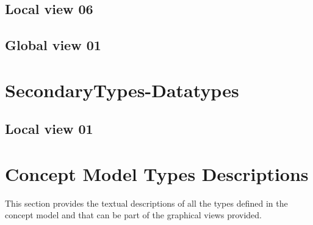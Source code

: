 \subsection{Local view 06}
\label{sec:ru.iu.bachelor.sed.group01.icrash-CM-view-local-PrimaryTypes-Datatypes-06}


\subsection{Global view 01}
\label{sec:ru.iu.bachelor.sed.group01.icrash-CM-view-global-PrimaryTypes-Datatypes-01}





\section{SecondaryTypes-Datatypes}
\subsection{Local view 01}
\label{sec:ru.iu.bachelor.sed.group01.icrash-CM-view-local-SecondaryTypes-Datatypes-01}






\section{Concept Model Types Descriptions}
This section provides the textual descriptions of all the types defined in the concept model and that can be part of the graphical views provided.













